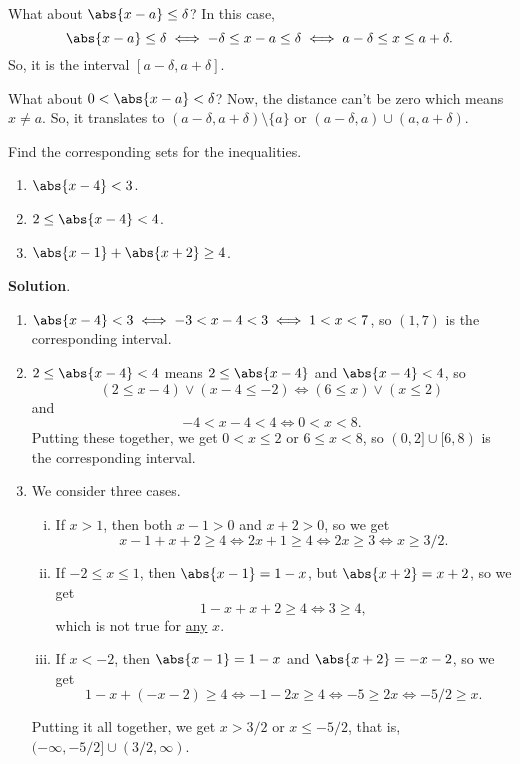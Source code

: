 What about $ \abs{x-a}\le \delta $? In this case,
\[ \abs{x-a}\le \delta\iff -\delta\le x-a\le \delta\iff a-\delta\le x\le a+\delta. \]
So, it is the interval $ [a-\delta,a+\delta] $.

What about $ 0<\abs{x-a}<\delta $? Now, the distance can't be zero which means $ x\ne a $. So,
it translates to $ (a-\delta,a+\delta)\setminus\{a\} $ or $ (a-\delta,a)\cup (a,a+\delta) $.

\begin{Example}{}{}
    Find the corresponding sets for the inequalities.
    \begin{enumerate}[(1)]
        \item $ \abs{x-4}<3 $.
        \item $ 2\le \abs{x-4}<4 $.
        \item $ \abs{x-1}+\abs{x+2}\ge 4 $.
    \end{enumerate}
    \tcblower{}
    \textbf{Solution}.
    \begin{enumerate}[(1)]
        \item $ \abs{x-4}<3\iff -3<x-4<3\iff 1<x<7 $, so $ (1,7) $ is the corresponding interval.
        \item $ 2\le \abs{x-4}<4 $ means $ 2\le \abs{x-4} $ and $ \abs{x-4}<4 $, so
              \[ (2\le x-4)\lor (x-4\le -2)\iff (6\le x)\lor (x\le 2) \]
              and
              \[ -4<x-4<4\iff 0<x<8. \]
              Putting these together, we get $ 0<x\le 2 $ or $ 6\le x<8 $, so $ (0,2]\cup [6,8) $ is the corresponding interval.
        \item We consider three cases.
              \begin{enumerate}[(i)]
                  \item If $ x> 1 $, then both $ x-1> 0 $ and $ x+2> 0 $, so we get
                        \[ x-1+x+2\ge 4\iff 2x+1\ge 4\iff 2x\ge 3\iff x\ge 3/2. \]
                  \item If $ -2\le x\le 1 $, then $ \abs{x-1}=1-x $, but $ \abs{x+2}=x+2 $, so we get
                        \[ 1-x+x+2\ge 4\iff 3\ge 4, \] which is not true for \underline{any} $ x $.
                  \item If $ x<-2 $, then $ \abs{x-1}=1-x $ and $ \abs{x+2}=-x-2 $, so we get
                        \[ 1-x+(-x-2)\ge 4\iff -1-2x\ge 4\iff -5\ge 2x\iff -5/2\ge x. \]
              \end{enumerate}
              Putting it all together, we get $ x>3/2 $ or $ x\le -5/2 $, that is,
              $ (-\infty,-5/2]\cup (3/2,\infty) $.
    \end{enumerate}
\end{Example}